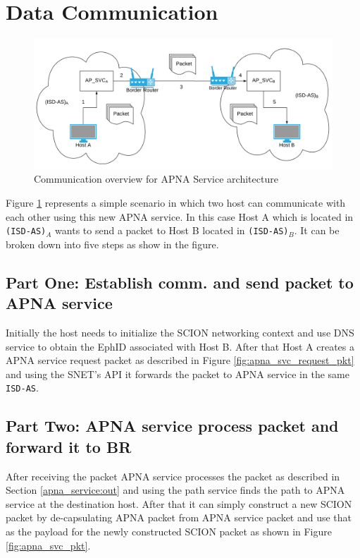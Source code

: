 \section{Data Communication}
\begin{figure}[th!!]
\centering
\hspace*{-1cm}\includegraphics[scale=0.35]{Figures/svc_arch.png}
\decoRule
\caption[Communication overview for APNA Service]{Communication overview for APNA Service architecture}
\label{fig:srv_comm}
\end{figure}
Figure \ref{fig:srv_comm} represents a simple scenario in which two host can communicate with each other using this new APNA service. In this case Host A which is located in \texttt{(ISD-AS)}$_A$ wants to send a packet to Host B located in \texttt{(ISD-AS)}$_B$. It can be broken down into five steps as show in the figure. 

\subsection{Part One: Establish comm. and send packet to APNA service}
Initially the host needs to initialize the SCION networking context and use DNS service to obtain the EphID associated with Host B. After that Host A creates a APNA service request packet as described in Figure \ref{fig:apna_svc_request_pkt} and using the SNET's API it forwards the packet to APNA service in the same \texttt{ISD-AS}. 

\subsection{Part Two: APNA service process packet and forward it to BR}
After receiving the packet APNA service processes the packet as described in Section \ref{apna_service:out} and using the path service finds the path to APNA service at the destination host. After that it can simply construct a new SCION packet by de-capsulating APNA packet from APNA service packet and use that as the payload for the newly constructed SCION packet as shown in Figure \ref{fig:apna_svc_pkt}. 

